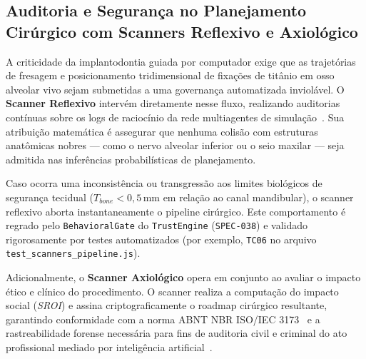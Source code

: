 \subsection{Auditoria e Segurança no Planejamento Cirúrgico com Scanners Reflexivo e Axiológico}

A criticidade da implantodontia guiada por computador exige que as trajetórias de fresagem e posicionamento tridimensional de fixações de titânio em osso alveolar vivo sejam submetidas a uma governança automatizada inviolável. O \textbf{Scanner Reflexivo} intervém diretamente nesse fluxo, realizando auditorias contínuas sobre os logs de raciocínio da rede multiagentes de simulação~\cite{alshadidi2024surface}. Sua atribuição matemática é assegurar que nenhuma colisão com estruturas anatômicas nobres --- como o nervo alveolar inferior ou o seio maxilar --- seja admitida nas inferências probabilísticas de planejamento.

Caso ocorra uma inconsistência ou transgressão aos limites biológicos de segurança tecidual ($T_{bone} < 0,5\,\text{mm}$ em relação ao canal mandibular), o scanner reflexivo aborta instantaneamente o pipeline cirúrgico. Este comportamento é regrado pelo \texttt{BehavioralGate} do \texttt{TrustEngine} (\texttt{SPEC-038}) e validado rigorosamente por testes automatizados (por exemplo, \texttt{TC06} no arquivo \texttt{test\_scanners\_pipeline.js}). 

Adicionalmente, o \textbf{Scanner Axiológico} opera em conjunto ao avaliar o impacto ético e clínico do procedimento. O scanner realiza a computação do impacto social (\textit{SROI}) e assina criptograficamente o roadmap cirúrgico resultante, garantindo conformidade com a norma ABNT NBR ISO/IEC 3173~\cite{abinc2026brasil} e a rastreabilidade forense necessária para fins de auditoria civil e criminal do ato profissional mediado por inteligência artificial~\cite{springer2026realising}.
